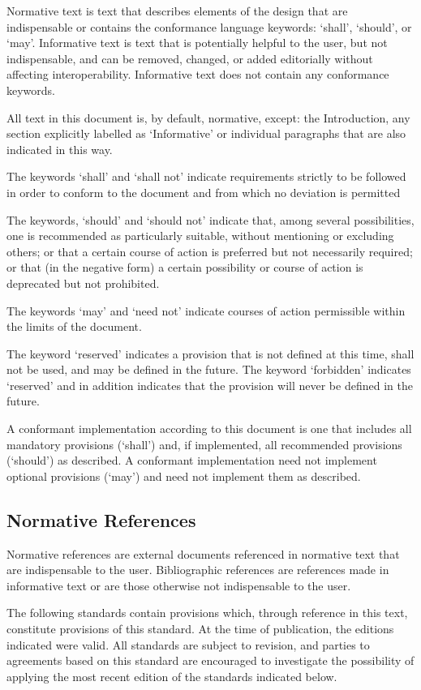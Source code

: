 
Normative text is text that describes elements of 
the design that are indispensable or contains the 
conformance language keywords: `shall', `should', or `may'. 
Informative text is text that is potentially helpful to the user, 
but not indispensable, and can be removed, changed, or added 
editorially without affecting interoperability. Informative 
text does not contain any conformance keywords.

All text in this document is, by default, normative, 
except: the Introduction, any section explicitly labelled as `Informative' 
or individual paragraphs that are also indicated in this way.

The keywords `shall' and `shall not' indicate requirements 
strictly to be followed in order to conform to the document 
and from which no deviation is permitted

The keywords, `should' and `should not' indicate that, among 
several possibilities, one is recommended as particularly suitable, 
without mentioning or excluding others; or that a certain course 
of action is preferred but not necessarily required; or that 
(in the negative form) a certain possibility or course of action is deprecated but not prohibited.

The keywords `may' and `need not' indicate courses of action 
permissible within the limits of the document.

The keyword `reserved' indicates a provision that is not 
defined at this time, shall not be used, and may be defined 
in the future. The keyword `forbidden' indicates `reserved' and in
 addition indicates that the provision will never be defined in the future.

A conformant implementation according to this document is one that includes 
all mandatory provisions (`shall') and, if implemented, all recommended 
provisions (`should') as described. A conformant implementation need 
not implement optional provisions (`may') and need not implement them as described.

\subsection{Normative References}
Normative references are external documents referenced in normative 
text that are indispensable to the user. Bibliographic references 
are references made in informative text or are those otherwise not
 indispensable to the user.

The following standards contain provisions which, through
 reference in this text, constitute provisions of this standard. 
 At the time of publication, the editions indicated were valid. 
 All standards are subject to revision, and parties to agreements
  based on this standard are encouraged to investigate the 
  possibility of applying the most recent edition of the standards indicated below.

